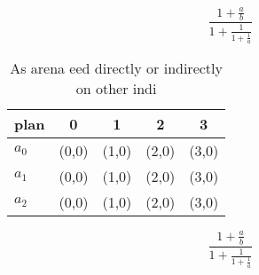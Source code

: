 \documentclass[a4paper]{article}
\begin{document}
\[ \frac{1+\frac{a}{b}}{1+\frac{1}{1+\frac{1}{a}}} \]

\begin{table}
\begin{adjustbox}{width=0.6\columnwidth}
\begin{tabular}{|l|l|l|l|l|}
\hline
\textbf{plan} & \multicolumn{1}{c|}{\textbf{0}} & \multicolumn{1}{c|}{\textbf{1}} & \multicolumn{1}{c|}{\textbf{2}} & \multicolumn{1}{c|}{\textbf{3}} \\ \hline
\textbf{$a_0$}  & (0,0) & (1,0) & (2,0) & (3,0) \\ \hline
\textbf{$a_1$}  & (0,0) & (1,0) & (2,0) & (3,0) \\ \hline
\textbf{$a_2$}  & (0,0) & (1,0) & (2,0) & (3,0) \\ \hline
\end{tabular}
\end{adjustbox}
\caption{As arena eed directly or indirectly on other indi
}
\end{table}

\[ \frac{1+\frac{a}{b}}{1+\frac{1}{1+\frac{1}{a}}} \]
\end{document}
